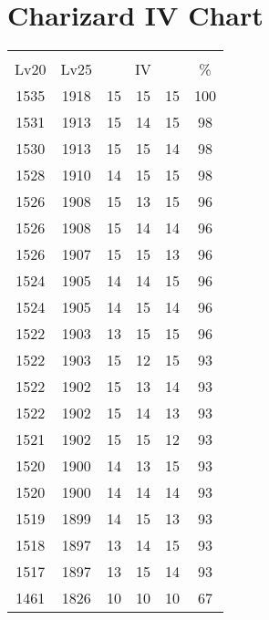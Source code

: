 \documentclass{article}%
\begin{document}
%
\normalsize%
\section{Charizard IV Chart}%
\label{sec:Charizard IV Chart}%
\renewcommand{\arraystretch}{1.5}%
\begin{tabular}{|c|c|c|c|c|c|}%
\hline%
\multicolumn{6}{|c|}{\textcolor{white}{ 
\linebreak{Charizard}
}%
\cellcolor{black}}\\%
\multicolumn{1}{|c}{Lv20}&\multicolumn{1}{c|}{Lv25}&\multicolumn{3}{c|}{IV}&\multicolumn{1}{|c|}{\%}\\%
\hline%
\rowcolor{color100}%
1535&1918&15&15&15&100\\%
\hline%
\rowcolor{color98}%
1531&1913&15&14&15&98\\%
\hline%
\rowcolor{color98}%
1530&1913&15&15&14&98\\%
\hline%
\rowcolor{color98}%
1528&1910&14&15&15&98\\%
\hline%
\rowcolor{color96}%
1526&1908&15&13&15&96\\%
\hline%
\rowcolor{color96}%
1526&1908&15&14&14&96\\%
\hline%
\rowcolor{color96}%
1526&1907&15&15&13&96\\%
\hline%
\rowcolor{color96}%
1524&1905&14&14&15&96\\%
\hline%
\rowcolor{color96}%
1524&1905&14&15&14&96\\%
\hline%
\rowcolor{color96}%
1522&1903&13&15&15&96\\%
\hline%
\rowcolor{color93}%
1522&1903&15&12&15&93\\%
\hline%
\rowcolor{color93}%
1522&1902&15&13&14&93\\%
\hline%
\rowcolor{color93}%
1522&1902&15&14&13&93\\%
\hline%
\rowcolor{color93}%
1521&1902&15&15&12&93\\%
\hline%
\rowcolor{color93}%
1520&1900&14&13&15&93\\%
\hline%
\rowcolor{color93}%
1520&1900&14&14&14&93\\%
\hline%
\rowcolor{color93}%
1519&1899&14&15&13&93\\%
\hline%
\rowcolor{color93}%
1518&1897&13&14&15&93\\%
\hline%
\rowcolor{color93}%
1517&1897&13&15&14&93\\%
\hline%
\rowcolor{color91}%
1461&1826&10&10&10&67\\%
\end{tabular}

%
\end{document}
